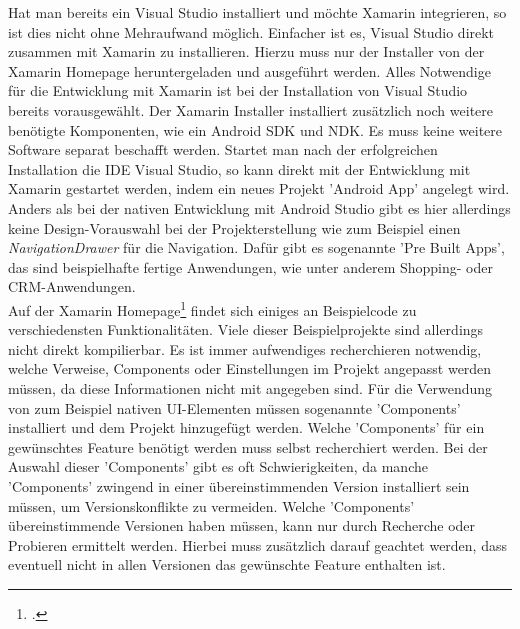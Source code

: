 Hat man bereits ein Visual Studio installiert und möchte Xamarin integrieren, so ist dies nicht ohne Mehraufwand möglich. Einfacher ist es, Visual Studio direkt zusammen mit Xamarin zu installieren. Hierzu muss nur der Installer von der Xamarin Homepage heruntergeladen und ausgeführt werden. Alles Notwendige für die Entwicklung mit Xamarin ist bei der Installation von Visual Studio bereits vorausgewählt. Der Xamarin Installer installiert zusätzlich noch weitere benötigte Komponenten, wie ein Android SDK und NDK. Es muss keine weitere Software separat beschafft werden. Startet man nach der erfolgreichen Installation die IDE Visual Studio, so kann direkt mit der Entwicklung mit Xamarin gestartet werden, indem ein neues Projekt 'Android App' angelegt wird. Anders als bei der nativen Entwicklung mit Android Studio gibt es hier allerdings keine Design-Vorauswahl bei der Projekterstellung wie zum Beispiel einen \textit{NavigationDrawer} für die Navigation. Dafür gibt es sogenannte 'Pre Built Apps', das sind beispielhafte fertige Anwendungen, wie unter anderem Shopping- oder CRM-Anwendungen. 
\\
Auf der Xamarin Homepage\footcite{XamarinHomepage} findet sich einiges an Beispielcode zu verschiedensten Funktionalitäten. Viele dieser Beispielprojekte sind allerdings nicht direkt kompilierbar. Es ist immer aufwendiges recherchieren notwendig, welche Verweise, Components oder Einstellungen im Projekt angepasst werden müssen, da diese Informationen nicht mit angegeben sind. Für die Verwendung von zum Beispiel nativen UI-Elementen müssen sogenannte 'Components' installiert und dem Projekt hinzugefügt werden. Welche 'Components' für ein gewünschtes Feature benötigt werden muss selbst recherchiert werden. Bei der Auswahl dieser 'Components' gibt es oft Schwierigkeiten, da manche 'Components' zwingend in einer übereinstimmenden Version installiert sein müssen, um Versionskonflikte zu vermeiden. Welche 'Components' übereinstimmende Versionen haben müssen, kann nur durch Recherche oder Probieren ermittelt werden. Hierbei muss zusätzlich darauf geachtet werden, dass eventuell nicht in allen Versionen das gewünschte Feature enthalten ist.
\\
